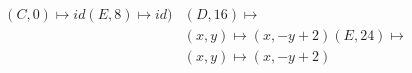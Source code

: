 \documentclass[preview]{standalone}
\begin{document}
\begin{align*}
(C,0) \mapsto id (E,8) \mapsto id) &(D,16) \mapsto \\& (x,y) \mapsto (x, -y + 2) (E,24) \mapsto \\& (x,y) \mapsto (x, -y + 2)
\end{align*}
\end{document}
